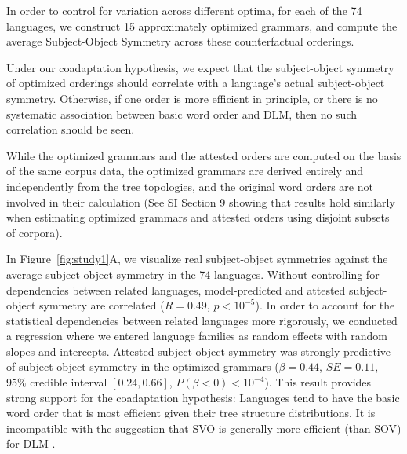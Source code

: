 \documentclass[11pt,a4paper]{article}
\newcommand\comment[1]{{\color{red}#1}}
\begin{document}
In order to control for variation across different optima, for each of the 74 languages, we construct 15 approximately optimized grammars, and compute the average Subject-Object Symmetry across these counterfactual orderings.



Under our coadaptation hypothesis, we expect that the subject-object symmetry of optimized orderings should correlate with a language's actual subject-object symmetry.
Otherwise, if one order is more efficient in principle, or there is no systematic association between basic word order and DLM, then no such correlation should be seen.


While the optimized grammars and the attested orders are computed on the basis of the same corpus data, the optimized grammars are derived entirely and independently from the tree topologies, and the original word orders are not involved in their calculation (See SI Section 9 showing that results hold similarly when estimating optimized grammars and attested orders using disjoint subsets of corpora).



In Figure~\ref{fig:study1}A, we visualize real subject-object symmetries against the average subject-object symmetry in the 74 languages.
Without controlling for dependencies between related languages, model-predicted and attested subject-object symmetry are correlated ($R=0.49$, $p<10^{-5}$).
In order to account for the statistical dependencies between related languages more rigorously, we conducted a regression where we entered language families as random effects with random slopes and intercepts.
Attested subject-object symmetry was strongly predictive of subject-object symmetry in the optimized grammars ($\beta = 0.44$, $SE=0.11$, $95\%$ credible interval $[0.24, 0.66]$, $P(\beta<0) < 10^{-4}$).
This result provides strong support for the coadaptation hypothesis: Languages tend to have the basic word order that is most efficient given their tree structure distributions.
It is incompatible with the suggestion that SVO is generally more efficient (than SOV) for DLM \citep{ferrer-i-cancho-placement-2017}.
\end{document}
